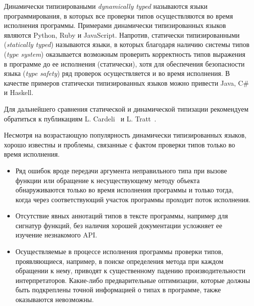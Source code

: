 \intro

Динамически типизироваными \emph{dynamically typed} называются языки
программирования, в которых все проверки типов осуществляются во время
исполнения программы. Примерами динамически типизированных языков являются
Python, Ruby и JavaScript.  Напротив, статически типизированными
(\emph{statically typed}) называются языки, в которых благодаря наличию системы
типов (\emph{type system}) оказывается возможным проверить корректность типов
выражения в программе до ее исполнения (статически), хотя для обеспечения
безопасности языка (\emph{type safety}) ряд проверок осуществляется и во время
исполнения.  В качестве примеров статически типизированных языков можно привести
Java, C\# и Haskell.

Для дальнейшего сравнения статической и динамической типизации рекомендуем
обратиться к публикациям L. Cardeli~\cite{Cardelli2004} и L. Tratt~\cite[]{Tratt2009}.

Несмотря на возрастающую популярность динамически типизированных языков,
хорошо известны и проблемы, связанные с фактом проверки типов только во время
исполнения.

\begin{itemize}
  \item{%
      Ряд ошибок вроде передачи аргумента неправильного типа при вызове
      функции или обращение к несуществующему методу объекта обнаруживаются
      только во время исполнения программы и только тогда, когда через
      соответствующий участок программы проходит поток исполнения.
    }
  \item{%
      Отсутствие явных аннотаций типов в тексте программы, например для сигнатур
      функций, без наличия хорошей документации усложняет ее изучение
      незнакомого API.
    }
  \item{%
      Осуществляемые в процессе исполнения программы проверки типов,
      проявляющиеся, например, в поиске определения метода при каждом обращении
      к нему, приводят к существенному падению производительности
      интерпретаторов. Какие-либо предварительные оптимизации, которые
      должны быть подкреплены точной информацией о типах в программе, также
      оказываются невозможны. 
    }
\end{itemize}

